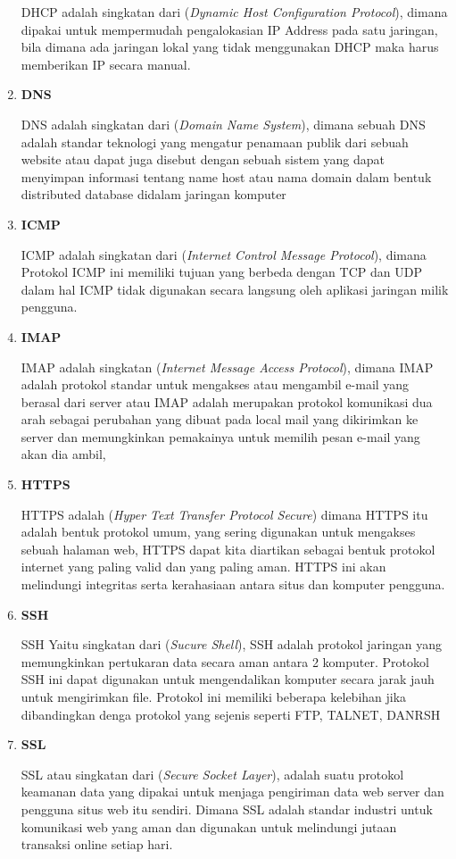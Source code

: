 \begin{enumerate}
DHCP adalah singkatan dari (\textit{Dynamic Host Configuration Protocol}), dimana dipakai untuk mempermudah pengalokasian IP Address pada satu jaringan, bila dimana ada jaringan lokal yang tidak menggunakan DHCP maka harus memberikan IP secara manual.
\item \textbf{DNS}

DNS adalah singkatan dari (\textit{Domain Name System}), dimana sebuah DNS adalah standar teknologi yang mengatur penamaan publik dari sebuah website atau dapat juga disebut dengan sebuah sistem yang dapat  menyimpan informasi tentang name host atau nama domain dalam bentuk distributed database didalam jaringan komputer
\item \textbf{ICMP}

ICMP adalah singkatan dari (\textit{Internet Control Message Protocol}), dimana Protokol ICMP ini memiliki tujuan yang berbeda dengan TCP dan UDP dalam hal ICMP tidak digunakan secara langsung oleh aplikasi jaringan milik pengguna.
\item \textbf{IMAP}

IMAP adalah singkatan (\textit{Internet Message Access Protocol}), dimana IMAP adalah protokol standar untuk mengakses atau mengambil e-mail yang berasal dari server atau  IMAP adalah merupakan protokol komunikasi dua arah sebagai perubahan yang dibuat pada local mail yang dikirimkan ke server dan memungkinkan pemakainya untuk memilih pesan e-mail yang akan dia ambil,
\item \textbf{HTTPS}

HTTPS adalah (\textit{Hyper Text Transfer Protocol Secure}) dimana HTTPS itu adalah  bentuk protokol umum, yang sering digunakan untuk mengakses sebuah halaman web, HTTPS dapat kita diartikan sebagai bentuk protokol internet yang paling valid dan yang paling aman. HTTPS ini akan melindungi integritas serta kerahasiaan antara situs dan komputer pengguna.
\item \textbf{SSH}

SSH Yaitu singkatan dari (\textit{Sucure Shell}), SSH adalah protokol jaringan yang memungkinkan pertukaran data secara aman antara 2 komputer. Protokol SSH ini dapat digunakan untuk mengendalikan komputer secara jarak jauh untuk mengirimkan file. Protokol ini  memiliki beberapa kelebihan jika dibandingkan denga protokol yang sejenis seperti FTP, TALNET, DANRSH
\item \textbf{ SSL}

SSL atau singkatan dari (\textit{Secure Socket Layer}), adalah suatu protokol keamanan data yang dipakai untuk menjaga pengiriman data web server dan  pengguna situs web itu sendiri. Dimana SSL adalah standar industri untuk komunikasi web yang aman dan digunakan untuk melindungi jutaan transaksi online setiap hari.
\end{enumerate}



